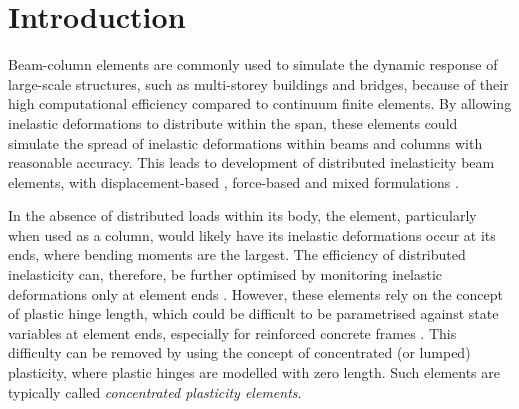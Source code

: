 \section{Introduction}
Beam-column elements are commonly used to simulate the dynamic response of large-scale structures, such as multi-storey buildings and bridges, because of their high computational efficiency compared to continuum finite elements.
By allowing inelastic deformations to distribute within the span, these elements could simulate the spread of inelastic deformations within beams and columns with reasonable accuracy.
This leads to development of distributed inelasticity beam elements, with displacement-based \citep[e.g.,][]{Bathe:96:FEP,Crisfield:97:Book2,Zienkiewicz:Taylor:05:FEM}, force-based \citep[e.g.,][]{Spacone:et:al:96:Fibre,Alemdar2005,Addessi2007,Sideris2016} and mixed formulations \citep[e.g.,][]{Neuenhofer:Filippou:97:Evaluation,Petrangeli:Ciampi:97:Equilibrium,Hjelmstad:Taciroglu:02:Mixed,Taylor:et:al:03:MixedForm,Nukala:White:04:Mixed,DallAsta:Zona:04:Mixed,Lee:Filippou:09:SecInversion}.

In the absence of distributed loads within its body, the element, particularly when used as a column, would likely have its inelastic deformations occur at its ends, where bending moments are the largest.
The efficiency of distributed inelasticity can, therefore, be further optimised by monitoring inelastic deformations only at element ends \citep[e.g.,][]{Attalla:et:al:84:SpreadOP,Scott:Fenves:06:BeamWithHinges,Lee:Filippou:09:SIZE,Scott:Ryan:13:PlasticHinge}.
However, these elements rely on the concept of plastic hinge length, which could be difficult to be parametrised against state variables at element ends, especially for reinforced concrete frames \citep{Park1975,Scott1996}.
This difficulty can be removed by using the concept of concentrated (or lumped) plasticity, where plastic hinges are modelled with zero length.
Such elements are typically called \emph{concentrated plasticity elements}.

